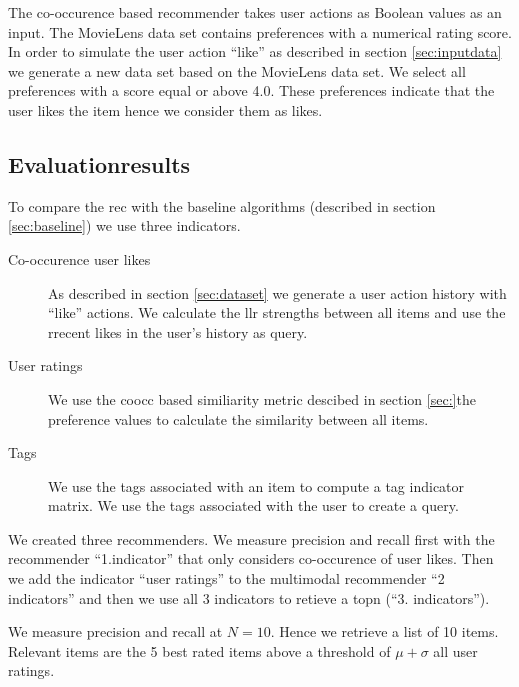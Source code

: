 The co-occurence based recommender takes user actions as Boolean values as an input. The MovieLens data set contains preferences with a numerical rating score. 
In order to simulate the user action ``like'' as described in section \ref{sec:inputdata} we generate a new data set based on the MovieLens data set. We select all preferences with a score equal or above 4.0. These \glspl{preference} indicate that the user likes the item hence we consider them as likes.

\subsection{Evaluationresults}
\label{sec:results}
To compare the \gls{rec} with the baseline algorithms (described in section \ref{sec:baseline}) we use three \glspl{indicator}.

\begin{description}
\item[Co-occurence user likes] As described in section \ref{sec:dataset} we generate a user action history with ``like'' actions. We calculate the \gls{llr} strengths between all items and use the rrecent likes in the user's history as query.
\item[User ratings] We use the \gls{coocc} based similiarity metric descibed in section \ref{sec:}the preference values to calculate the  similarity between all items.
\item[Tags] We use the tags associated with an item to compute a tag \gls{indicator} matrix. We use the tags associated with the user to create a query.
\end{description}

We created three recommenders. We measure precision and recall first with the recommender ``1.indicator'' that only considers co-occurence of user likes. Then we add the indicator ``user ratings'' to the multimodal recommender ``2 indicators'' and then we use all 3 indicators to retieve a \gls{topn} (``3. indicators''). 

We measure precision and recall at $N=10$. Hence we retrieve a list of 10 items. Relevant items are the 5 best rated items above a threshold of $\mu + \sigma$ all user ratings.

